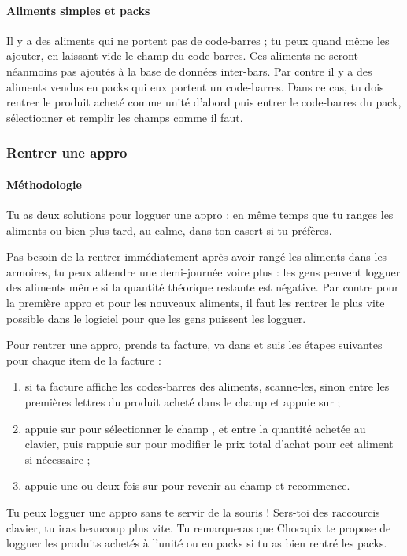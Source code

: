 \documentclass[12pt,french]{article}
\begin{document}
\paragraph{Aliments simples et packs} Il y a des aliments qui ne portent pas de code-barres ; tu peux quand même les ajouter, en laissant vide le champ du code-barres. Ces aliments ne seront néanmoins pas ajoutés à la base de données inter-bars. Par contre il y a des aliments vendus en packs qui eux portent un code-barres. Dans ce cas, tu dois rentrer le produit acheté comme unité d'abord puis entrer le code-barres du pack, sélectionner  et remplir les champs comme il faut.

\subsubsection{Rentrer une appro}

\paragraph{Méthodologie} Tu as deux solutions pour logguer une appro : en même temps que tu ranges les aliments ou bien plus tard, au calme, dans ton casert si tu préfères.

Pas besoin de la rentrer immédiatement après avoir rangé les aliments dans les armoires, tu peux attendre une demi-journée voire plus : les gens peuvent logguer des aliments même si la quantité théorique restante est négative. Par contre pour la première appro et pour les nouveaux aliments, il faut les rentrer le plus vite possible dans le logiciel pour que les gens puissent les logguer.

Pour rentrer une appro, prends ta facture, va dans  et suis les étapes suivantes pour chaque item de la facture :
\begin{enumerate}
	\item si ta facture affiche les codes-barres des aliments, scanne-les, sinon entre les premières lettres du produit acheté dans le champ  et appuie sur  ;
	\item appuie sur  pour sélectionner le champ , et entre la quantité achetée au clavier, puis rappuie sur  pour modifier le prix total d'achat pour cet aliment si nécessaire ;
	\item appuie une ou deux fois sur  pour revenir au champ  et recommence.
\end{enumerate}
Tu peux logguer une appro sans te servir de la souris ! Sers-toi des raccourcis clavier, tu iras beaucoup plus vite. Tu remarqueras que Chocapix te propose de logguer les produits achetés à l'unité ou en packs si tu as bien rentré les packs.
\end{document}
